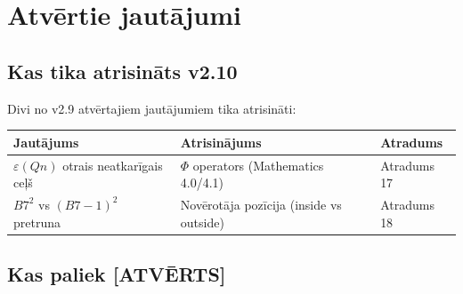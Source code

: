 \documentclass[12pt,a4paper]{article}
\begin{document}
\newpage

\section{Atvērtie jautājumi}
\label{sec:atvertie}

\subsection*{Kas tika atrisināts v2.10}

Divi no v2.9 atvērtajiem jautājumiem tika atrisināti:

\begin{table}[h]
\centering
\begin{tabular}{|l|l|l|}
\hline
\textbf{Jautājums} & \textbf{Atrisinājums} & \textbf{Atradums} \\
\hline
$\varepsilon(Qn)$ otrais neatkarīgais ceļš & $\Phi$ operators (Mathematics 4.0/4.1) & Atradums 17 \\
$B7^2$ vs $(B7-1)^2$ pretruna & Novērotāja pozīcija (inside vs outside) & Atradums 18 \\
\hline
\end{tabular}
\end{table}

\subsection*{Kas paliek [ATVĒRTS]}
\end{document}
